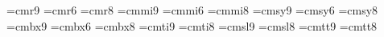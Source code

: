 %
%
%
%
%
%
%
%
%
%
%
%
%
%
%
%
%
%
\font\ninerm=cmr9   \font\sixrm=cmr6   \font\eightrm=cmr8
\font\ninei=cmmi9   \font\sixi=cmmi6   \font\eighti=cmmi8
\font\ninesy=cmsy9  \font\sixsy=cmsy6  \font\eightsy=cmsy8
\font\ninebf=cmbx9  \font\sixbf=cmbx6  \font\eightbf=cmbx8
\font\nineit=cmti9                     \font\eightit=cmti8
\font\ninesl=cmsl9                     \font\eightsl=cmsl8
\font\ninett=cmtt9                     \font\eighttt=cmtt8
%
\def\ninepoint{\def\rm{\fam0\ninerm}%
 \textfont0=\ninerm \scriptfont0=\sixrm \scriptscriptfont0=\fiverm
 \textfont1=\ninei \scriptfont1=\sixi \scriptscriptfont1=\fivei
 \textfont2=\ninesy \scriptfont2=\sixsy \scriptscriptfont2=\fivesy
 \textfont3=\tenex \scriptfont3=\tenex \scriptscriptfont3=\tenex
 \textfont\itfam=\nineit \def\it{\fam\itfam\nineit}%
 \textfont\slfam=\ninesl \def\sl{\fam\slfam\ninesl}%
 \textfont\ttfam=\ninett \def\tt{\fam\ttfam\ninett}%
 \textfont\bffam=\ninebf \scriptfont\bffam=\sixbf
 \scriptscriptfont\bffam=\fivebf \def\bf{\fam\bffam\ninebf}%
 \normalbaselineskip=11pt
 \setbox\strutbox=\hbox{\vrule height8pt depth3pt width0pt}%
 \let\sc=\sevenrm \let\big=\ninebig \normalbaselines\rm}
